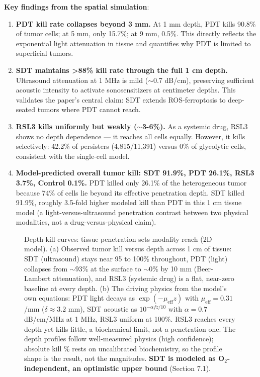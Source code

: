 \documentclass[11pt,twoside,openright]{report}
\begin{document}
\textbf{Key findings from the spatial simulation}:

\begin{enumerate}
\item \textbf{PDT kill rate collapses beyond 3 mm.} At 1 mm depth, PDT kills 90.8\% of tumor cells; at 5 mm, only 15.7\%; at 9 mm, 0.5\%. This directly reflects the exponential light attenuation in tissue and quantifies why PDT is limited to superficial tumors.
\item \textbf{SDT maintains >88\% kill rate through the full 1 cm depth.} Ultrasound attenuation at 1 MHz is mild ($\sim$0.7 dB/cm), preserving sufficient acoustic intensity to activate sonosensitizers at centimeter depths. This validates the paper's central claim: SDT extends ROS-ferroptosis to deep-seated tumors where PDT cannot reach.
\item \textbf{RSL3 kills uniformly but weakly ($\sim$3-6\%).} As a systemic drug, RSL3 shows no depth dependence --- it reaches all cells equally. However, it kills selectively: 42.2\% of persisters (4,815/11,391) versus 0\% of glycolytic cells, consistent with the single-cell model.
\item \textbf{Model-predicted overall tumor kill: SDT 91.9\%, PDT 26.1\%, RSL3 3.7\%, Control 0.1\%.} PDT killed only 26.1\% of the heterogeneous tumor because 74\% of cells lie beyond its effective penetration depth. SDT killed 91.9\%, roughly 3.5-fold higher modeled kill than PDT in this 1 cm tissue model (a light-versus-ultrasound penetration contrast between two physical modalities, not a drug-versus-physical claim).
\end{enumerate}

\begin{figure}[tbp]
\setcounter{figure}{7}
\caption{Depth-kill curves: tissue penetration sets modality reach (2D model). (a) Observed tumor kill versus depth across 1 cm of tissue: SDT (ultrasound) stays near 95 to 100\% throughout, PDT (light) collapses from ${\sim}93\%$ at the surface to ${\sim}0\%$ by 10 mm (Beer-Lambert attenuation), and RSL3 (systemic drug) is a flat, near-zero baseline at every depth. (b) The driving physics from the model's own equations: PDT light decays as $\exp(-\mu_{\mathrm{eff}} z)$ with $\mu_{\mathrm{eff}}{=}0.31$/mm ($\delta{\approx}3.2$ mm), SDT acoustic as $10^{-\alpha f z/10}$ with $\alpha{=}0.7$ dB/cm/MHz at 1 MHz, RSL3 uniform at 100\%. RSL3 reaches every depth yet kills little, a biochemical limit, not a penetration one. The depth profiles follow well-measured physics (high confidence); absolute kill \% rests on uncalibrated biochemistry, so the profile shape is the result, not the magnitudes. \textbf{SDT is modeled as O$_2$-independent, an optimistic upper bound} (Section 7.1).}
\label{fig:fig8_simulation_by_treatment}
\end{figure}
\end{document}
